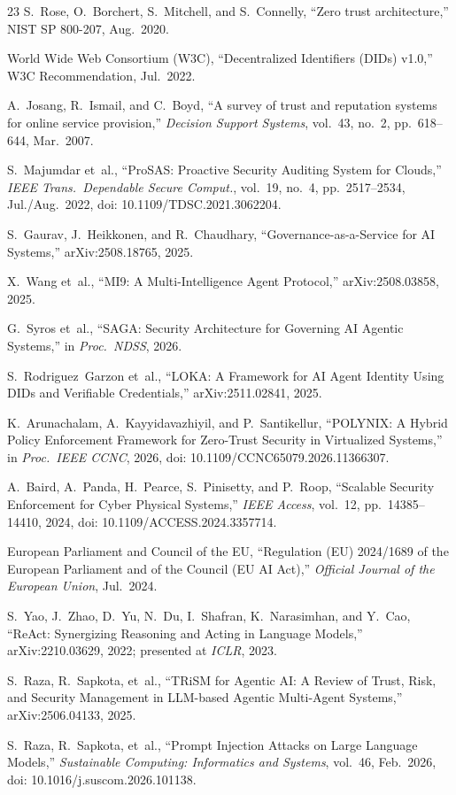 \documentclass{IEEEcsmag}
\begin{document}
\begin{thebibliography}{23}
S.~Rose, O.~Borchert, S.~Mitchell, and S.~Connelly, ``Zero trust architecture,'' NIST SP 800-207, Aug.\ 2020.

World Wide Web Consortium (W3C), ``Decentralized Identifiers (DIDs) v1.0,'' W3C Recommendation, Jul.\ 2022.

A.~Josang, R.~Ismail, and C.~Boyd, ``A survey of trust and reputation systems for online service provision,'' {\it Decision Support Systems}, vol.~43, no.~2, pp.~618--644, Mar.\ 2007.

S.~Majumdar et~al., ``ProSAS: Proactive Security Auditing System for Clouds,'' {\it IEEE Trans.\ Dependable Secure Comput.}, vol.~19, no.~4, pp.~2517--2534, Jul./Aug.\ 2022, doi: 10.1109/TDSC.2021.3062204.

S.~Gaurav, J.~Heikkonen, and R.~Chaudhary, ``Governance-as-a-Service for AI Systems,'' arXiv:2508.18765, 2025.

X.~Wang et~al., ``MI9: A Multi-Intelligence Agent Protocol,'' arXiv:2508.03858, 2025.

G.~Syros et~al., ``SAGA: Security Architecture for Governing AI Agentic Systems,'' in {\it Proc.\ NDSS}, 2026.

S.~Rodriguez~Garzon et~al., ``LOKA: A Framework for AI Agent Identity Using DIDs and Verifiable Credentials,'' arXiv:2511.02841, 2025.

K.~Arunachalam, A.~Kayyidavazhiyil, and P.~Santikellur, ``POLYNIX: A Hybrid Policy Enforcement Framework for Zero-Trust Security in Virtualized Systems,'' in {\it Proc.\ IEEE CCNC}, 2026, doi: 10.1109/CCNC65079.2026.11366307.

A.~Baird, A.~Panda, H.~Pearce, S.~Pinisetty, and P.~Roop, ``Scalable Security Enforcement for Cyber Physical Systems,'' {\it IEEE Access}, vol.~12, pp.~14385--14410, 2024, doi: 10.1109/ACCESS.2024.3357714.

European Parliament and Council of the EU, ``Regulation (EU) 2024/1689 of the European Parliament and of the Council (EU AI Act),'' {\it Official Journal of the European Union}, Jul.\ 2024.

S.~Yao, J.~Zhao, D.~Yu, N.~Du, I.~Shafran, K.~Narasimhan, and Y.~Cao, ``ReAct: Synergizing Reasoning and Acting in Language Models,'' arXiv:2210.03629, 2022; presented at {\it ICLR}, 2023.

S.~Raza, R.~Sapkota, et~al., ``TRiSM for Agentic AI: A Review of Trust, Risk, and Security Management in LLM-based Agentic Multi-Agent Systems,'' arXiv:2506.04133, 2025.

S.~Raza, R.~Sapkota, et~al., ``Prompt Injection Attacks on Large Language Models,'' {\it Sustainable Computing: Informatics and Systems}, vol.~46, Feb.\ 2026, doi: 10.1016/j.suscom.2026.101138.

\end{thebibliography}
\end{document}
